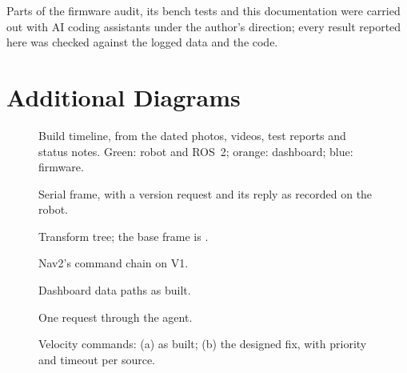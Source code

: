 \documentclass[11pt]{article}
\begin{document}
Parts of the firmware audit, its bench tests and this documentation were carried out with AI coding assistants under the author's direction; every result reported here was checked against the logged data and the code.

\clearpage
{\small


}

\clearpage
\appendix
\section{Additional Diagrams}

\begin{figure}[htbp]
  \centering
  \caption{Build timeline, from the dated photos, videos, test reports and status notes. Green: robot and ROS~2; orange: dashboard; blue: firmware.}
  \label{fig:timeline}
\end{figure}

\begin{figure}[htbp]
  \centering
  \caption{Serial frame, with a version request and its reply as recorded on the robot.}
  \label{fig:packet}
\end{figure}

\begin{figure}[htbp]
  \centering
  \caption{Transform tree; the base frame is .}
  \label{fig:tf}
\end{figure}

\begin{figure}[htbp]
  \centering
  \caption{Nav2's command chain on V1.}
  \label{fig:nav}
\end{figure}

\begin{figure}[htbp]
  \centering
  \caption{Dashboard data paths as built.}
  \label{fig:dashpath}
\end{figure}

\begin{figure}[htbp]
  \centering
  \caption{One request through the agent.}
  \label{fig:seq}
\end{figure}

\begin{figure}[htbp]
  \centering
  \caption{Velocity commands: (a) as built; (b) the designed fix, with priority and timeout per source.}
  \label{fig:mux}
\end{figure}
\end{document}
